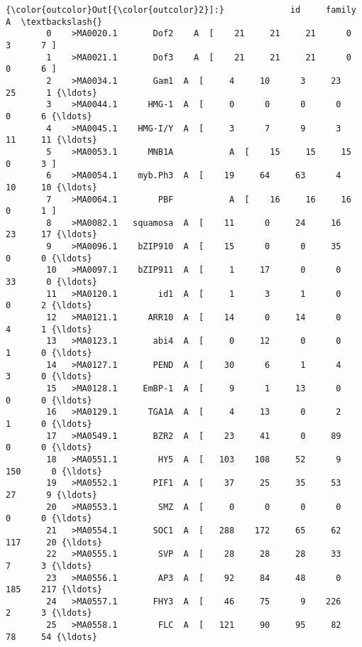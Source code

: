 \documentclass[11pt]{article}
\begin{document}
\begin{Verbatim}[commandchars=\\\{\}]
{\color{outcolor}Out[{\color{outcolor}2}]:}             id     family                                                  A  \textbackslash{}
        0    >MA0020.1       Dof2    A  [    21     21     21      0      3      7 ]   
        1    >MA0021.1       Dof3    A  [    21     21     21      0      0      6 ]   
        2    >MA0034.1       Gam1  A  [     4     10      3     23     25      1 {\ldots}   
        3    >MA0044.1      HMG-1  A  [     0      0      0      0      0      6 {\ldots}   
        4    >MA0045.1    HMG-I/Y  A  [     3      7      9      3     11     11 {\ldots}   
        5    >MA0053.1      MNB1A           A  [    15     15     15      0      3 ]   
        6    >MA0054.1    myb.Ph3  A  [    19     64     63      4     10     10 {\ldots}   
        7    >MA0064.1        PBF           A  [    16     16     16      0      1 ]   
        8    >MA0082.1   squamosa  A  [    11      0     24     16     23     17 {\ldots}   
        9    >MA0096.1    bZIP910  A  [    15      0      0     35      0      0 {\ldots}   
        10   >MA0097.1    bZIP911  A  [     1     17      0      0     33      0 {\ldots}   
        11   >MA0120.1        id1  A  [     1      3      1      0      0      2 {\ldots}   
        12   >MA0121.1      ARR10  A  [    14      0     14      0      4      1 {\ldots}   
        13   >MA0123.1       abi4  A  [     0     12      0      0      1      0 {\ldots}   
        14   >MA0127.1       PEND  A  [    30      6      1      4      3      0 {\ldots}   
        15   >MA0128.1     EmBP-1  A  [     9      1     13      0      0      0 {\ldots}   
        16   >MA0129.1      TGA1A  A  [     4     13      0      2      1      0 {\ldots}   
        17   >MA0549.1       BZR2  A  [    23     41      0     89      0      0 {\ldots}   
        18   >MA0551.1        HY5  A  [   103    108     52      9    150      0 {\ldots}   
        19   >MA0552.1       PIF1  A  [    37     25     35     53     27      9 {\ldots}   
        20   >MA0553.1        SMZ  A  [     0      0      0      0      0      0 {\ldots}   
        21   >MA0554.1       SOC1  A  [   288    172     65     62    117     20 {\ldots}   
        22   >MA0555.1        SVP  A  [    28     28     28     33      7      3 {\ldots}   
        23   >MA0556.1        AP3  A  [    92     84     48      0    185    217 {\ldots}   
        24   >MA0557.1       FHY3  A  [    46     75      9    226      2      3 {\ldots}   
        25   >MA0558.1        FLC  A  [   121     90     95     82     78     54 {\ldots}   

\end{Verbatim}
\end{document}
